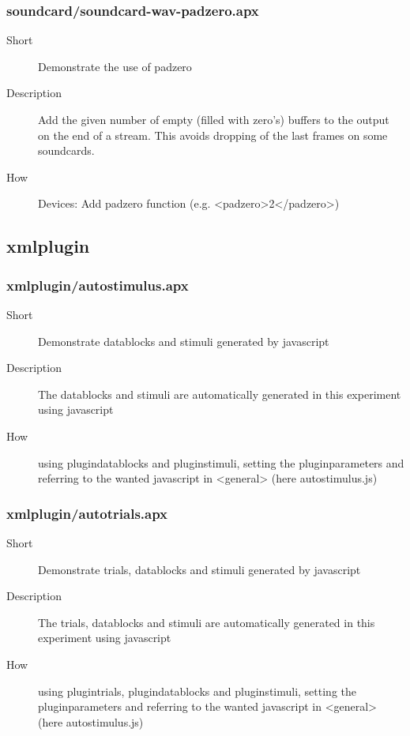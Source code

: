 \subsubsection{soundcard/soundcard-wav-padzero.apx}
\begin{description}
\item[Short] 
 Demonstrate the use of padzero
\item[Description] 
 Add the given number of empty (filled with zero's) buffers to the output on the end of a stream. This avoids dropping of the last frames on some soundcards.
\item[How] 
 Devices: Add padzero function (e.g. \textless{}padzero\textgreater{}2\textless{}/padzero\textgreater{})
\end{description}

\subsection{xmlplugin}
\subsubsection{xmlplugin/autostimulus.apx}
\begin{description}
\item[Short] 
 Demonstrate datablocks and stimuli generated by javascript
\item[Description] 
 The datablocks and stimuli are automatically generated in this experiment using javascript
\item[How] 
 using plugindatablocks and pluginstimuli, setting the pluginparameters and referring to the wanted javascript in \textless{}general\textgreater{} (here autostimulus.js)
\end{description}

\subsubsection{xmlplugin/autotrials.apx}
\begin{description}
\item[Short] 
 Demonstrate trials, datablocks and stimuli generated by javascript
\item[Description] 
 The trials, datablocks and stimuli are automatically generated in this experiment using javascript
\item[How] 
 using plugintrials, plugindatablocks and pluginstimuli, setting the pluginparameters and referring to the wanted javascript in \textless{}general\textgreater{} (here autostimulus.js)
\end{description}


